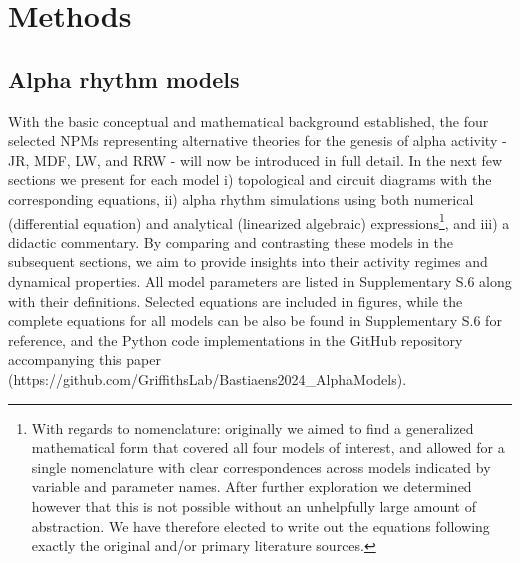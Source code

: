 \documentclass[12pt,twoside]{article}
\begin{document}

\section{Methods}


\subsection{Alpha rhythm models} 
With the basic conceptual and mathematical background established, the four selected NPMs representing alternative theories for the genesis of alpha activity - JR, MDF, LW, and RRW - will now be introduced in full detail. In the next few sections we present for each model i) topological and circuit diagrams with the corresponding equations, ii) alpha rhythm simulations using both numerical (differential equation) and analytical (linearized algebraic) expressions\footnote{With regards to nomenclature: originally we aimed to find a generalized mathematical form that covered all four models of interest, and allowed for a single nomenclature with clear correspondences across models indicated by variable and parameter names. After further exploration we determined however that this is not possible without an unhelpfully large amount of abstraction. We have therefore elected to write out the equations following exactly the original and/or primary literature sources.}, and iii) a didactic commentary. By comparing and contrasting these models in the subsequent sections, we aim to provide insights into their activity regimes and dynamical properties. All model parameters are listed in Supplementary S.6 along with their definitions. Selected equations are included in figures, while the complete equations for all models can be also be found in Supplementary S.6 for reference, and the Python code implementations in the GitHub repository accompanying this paper (https://github.com/GriffithsLab/Bastiaens2024\_AlphaModels). 
\end{document}
